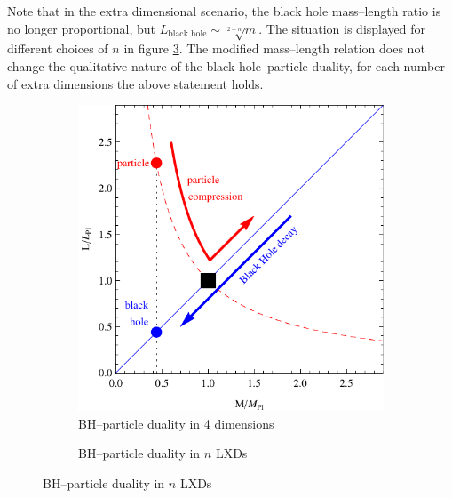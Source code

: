 \documentclass[12pt,a4paper]{report}
\numberwithin{equation}{chapter}
\begin{document}
Note that in the extra dimensional scenario, the black hole mass--length ratio is no longer proportional, but $L_\text{black hole} \sim \sqrt[2+n]{m}$. The situation is displayed for different choices of $n$ in figure \ref{fig:bh-duality-STM}. The modified mass--length relation does not change the qualitative nature of the black hole--particle duality, for each number of extra dimensions the above statement holds.

\begin{figure}
\centering
\begin{subfigure}{0.5\textwidth}
\caption{BH--particle duality in 4 dimensions}\label{fig:bh-duality-SSM}
\includegraphics[width=\textwidth]{figures/completeness-schwarzschild.pdf}
\end{subfigure}%
\begin{subfigure}{0.5\textwidth}
\caption{BH--particle duality in $n$ LXDs}\label{fig:bh-duality-STM}

\end{subfigure}
\end{figure}
\end{document}
